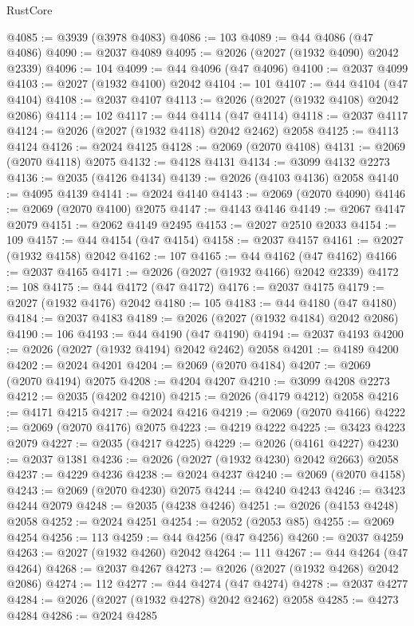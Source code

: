 \begin{lexlean}{RustCore}
\begin{coremodule}
@4085 := @3939 (@3978 @4083)
@4086 := 103
@4089 := @44 @4086 (@47 @4086)
@4090 := @2037 @4089
@4095 := @2026 (@2027 (@1932 @4090) @2042 @2339)
@4096 := 104
@4099 := @44 @4096 (@47 @4096)
@4100 := @2037 @4099
@4103 := @2027 (@1932 @4100) @2042
@4104 := 101
@4107 := @44 @4104 (@47 @4104)
@4108 := @2037 @4107
@4113 := @2026 (@2027 (@1932 @4108) @2042 @2086)
@4114 := 102
@4117 := @44 @4114 (@47 @4114)
@4118 := @2037 @4117
@4124 := @2026 (@2027 (@1932 @4118) @2042 @2462) @2058
@4125 := @4113 @4124
@4126 := @2024 @4125
@4128 := @2069 (@2070 @4108)
@4131 := @2069 (@2070 @4118) @2075
@4132 := @4128 @4131
@4134 := @3099 @4132 @2273
@4136 := @2035 (@4126 @4134)
@4139 := @2026 (@4103 @4136) @2058
@4140 := @4095 @4139
@4141 := @2024 @4140
@4143 := @2069 (@2070 @4090)
@4146 := @2069 (@2070 @4100) @2075
@4147 := @4143 @4146
@4149 := @2067 @4147 @2079
@4151 := @2062 @4149 @2495
@4153 := @2027 @2510 @2033
@4154 := 109
@4157 := @44 @4154 (@47 @4154)
@4158 := @2037 @4157
@4161 := @2027 (@1932 @4158) @2042
@4162 := 107
@4165 := @44 @4162 (@47 @4162)
@4166 := @2037 @4165
@4171 := @2026 (@2027 (@1932 @4166) @2042 @2339)
@4172 := 108
@4175 := @44 @4172 (@47 @4172)
@4176 := @2037 @4175
@4179 := @2027 (@1932 @4176) @2042
@4180 := 105
@4183 := @44 @4180 (@47 @4180)
@4184 := @2037 @4183
@4189 := @2026 (@2027 (@1932 @4184) @2042 @2086)
@4190 := 106
@4193 := @44 @4190 (@47 @4190)
@4194 := @2037 @4193
@4200 := @2026 (@2027 (@1932 @4194) @2042 @2462) @2058
@4201 := @4189 @4200
@4202 := @2024 @4201
@4204 := @2069 (@2070 @4184)
@4207 := @2069 (@2070 @4194) @2075
@4208 := @4204 @4207
@4210 := @3099 @4208 @2273
@4212 := @2035 (@4202 @4210)
@4215 := @2026 (@4179 @4212) @2058
@4216 := @4171 @4215
@4217 := @2024 @4216
@4219 := @2069 (@2070 @4166)
@4222 := @2069 (@2070 @4176) @2075
@4223 := @4219 @4222
@4225 := @3423 @4223 @2079
@4227 := @2035 (@4217 @4225)
@4229 := @2026 (@4161 @4227)
@4230 := @2037 @1381
@4236 := @2026 (@2027 (@1932 @4230) @2042 @2663) @2058
@4237 := @4229 @4236
@4238 := @2024 @4237
@4240 := @2069 (@2070 @4158)
@4243 := @2069 (@2070 @4230) @2075
@4244 := @4240 @4243
@4246 := @3423 @4244 @2079
@4248 := @2035 (@4238 @4246)
@4251 := @2026 (@4153 @4248) @2058
@4252 := @2024 @4251
@4254 := @2052 (@2053 @85)
@4255 := @2069 @4254
@4256 := 113
@4259 := @44 @4256 (@47 @4256)
@4260 := @2037 @4259
@4263 := @2027 (@1932 @4260) @2042
@4264 := 111
@4267 := @44 @4264 (@47 @4264)
@4268 := @2037 @4267
@4273 := @2026 (@2027 (@1932 @4268) @2042 @2086)
@4274 := 112
@4277 := @44 @4274 (@47 @4274)
@4278 := @2037 @4277
@4284 := @2026 (@2027 (@1932 @4278) @2042 @2462) @2058
@4285 := @4273 @4284
@4286 := @2024 @4285

\end{coremodule}
\end{lexlean}
